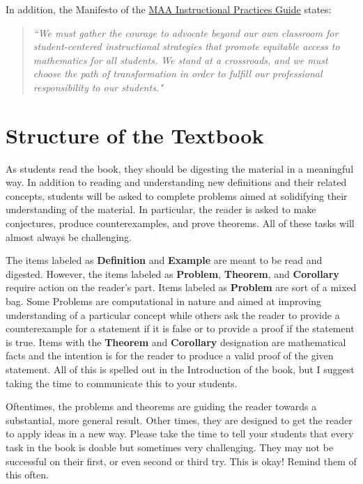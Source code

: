 \documentclass[11pt]{article}%
\newcommand{\blankline}{\pagebreak[2]\vspace{.5\baselineskip}}
\begin{document}
In addition, the Manifesto of the \href{https://www.maa.org/programs-and-communities/curriculum%20resources/instructional-practices-guide}{MAA Instructional Practices Guide} states: 

\begin{quote}
\emph{``We must gather the courage to advocate beyond our own classroom for student-centered instructional strategies that promote equitable access to mathematics for all students. We stand at a crossroads, and we must choose the path of transformation in order to fulfill our professional responsibility to our students."}
\end{quote}


\section*{Structure of the Textbook}

As students read the book, they should be digesting the material in a meaningful way.  In addition to reading and understanding new definitions and their related concepts, students will be asked to complete problems aimed at solidifying their understanding of the material.  In particular, the reader is asked to make conjectures, produce counterexamples, and prove theorems. All of these tasks will almost always be challenging.

\blankline

The items labeled as \textbf{Definition} and \textbf{Example} are meant to be read and digested.  However, the items labeled as \textbf{Problem}, \textbf{Theorem}, and \textbf{Corollary} require action on the reader's part.  Items labeled as \textbf{Problem} are sort of a mixed bag. Some Problems are computational in nature and aimed at improving understanding of a particular concept while others ask the reader to provide a counterexample for a statement if it is false or to provide a proof if the statement is true. Items with the \textbf{Theorem} and \textbf{Corollary} designation are mathematical facts and the intention is for the reader to produce a valid proof of the given statement. All of this is spelled out in the Introduction of the book, but I suggest taking the time to communicate this to your students.

\blankline

Oftentimes, the problems and theorems are guiding the reader towards a substantial, more  general result. Other times, they are designed to get the reader to apply ideas in a new way. Please take the time to tell your students that every task in the book is doable but sometimes very challenging.  They may not be successful on their first, or even second or third try.  This is okay!  Remind them of this often. 
\end{document}
